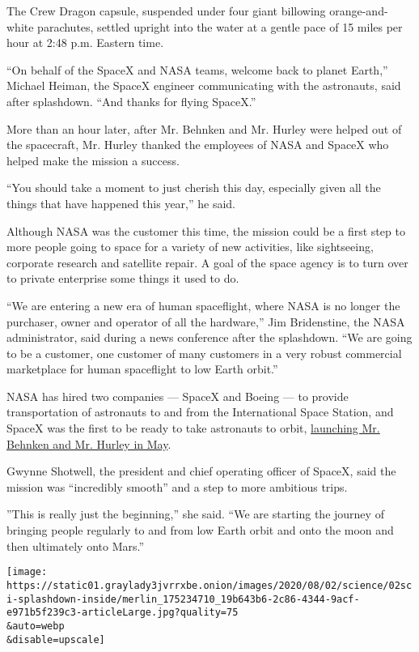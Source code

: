 The Crew Dragon capsule, suspended under four giant billowing
orange-and-white parachutes, settled upright into the water at a gentle
pace of 15 miles per hour at 2:48 p.m. Eastern time.

``On behalf of the SpaceX and NASA teams, welcome back to planet
Earth,'' Michael Heiman, the SpaceX engineer communicating with the
astronauts, said after splashdown. ``And thanks for flying SpaceX.''

More than an hour later, after Mr. Behnken and Mr. Hurley were helped
out of the spacecraft, Mr. Hurley thanked the employees of NASA and
SpaceX who helped make the mission a success.

``You should take a moment to just cherish this day, especially given
all the things that have happened this year,'' he said.

Although NASA was the customer this time, the mission could be a first
step to more people going to space for a variety of new activities, like
sightseeing, corporate research and satellite repair. A goal of the
space agency is to turn over to private enterprise some things it used
to do.

``We are entering a new era of human spaceflight, where NASA is no
longer the purchaser, owner and operator of all the hardware,'' Jim
Bridenstine, the NASA administrator, said during a news conference after
the splashdown. ``We are going to be a customer, one customer of many
customers in a very robust commercial marketplace for human spaceflight
to low Earth orbit.''

NASA has hired two companies --- SpaceX and Boeing --- to provide
transportation of astronauts to and from the International Space
Station, and SpaceX was the first to be ready to take astronauts to
orbit,
\href{https://www.nytimes3xbfgragh.onion/2020/05/30/science/spacex-nasa-astronauts.html}{launching
Mr. Behnken and Mr. Hurley in May}.

Gwynne Shotwell, the president and chief operating officer of SpaceX,
said the mission was ``incredibly smooth'' and a step to more ambitious
trips.

''This is really just the beginning,'' she said. ``We are starting the
journey of bringing people regularly to and from low Earth orbit and
onto the moon and then ultimately onto Mars.''

\texttt{[image: https://static01.graylady3jvrrxbe.onion/images/2020/08/02/science/02sci-splashdown-inside/merlin\_175234710\_19b643b6-2c86-4344-9acf-e971b5f239c3-articleLarge.jpg?quality=75\\\&auto=webp\\\&disable=upscale]}

